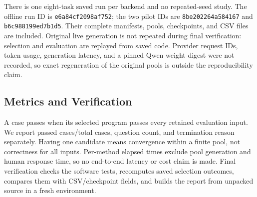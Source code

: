 There is one eight-task saved run per backend and no repeated-seed study. The offline run ID is \texttt{e6a84cf2098af752}; the two pilot IDs are \texttt{8be202264a584167} and \texttt{b6c988199ed7b1d5}. Their complete manifests, pools, checkpoints, and CSV files are included. Original live generation is not repeated during final verification: selection and evaluation are replayed from saved code. Provider request IDs, token usage, generation latency, and a pinned Qwen weight digest were not recorded, so exact regeneration of the original pools is outside the reproducibility claim.

\subsection{Metrics and Verification}
A case passes when its selected program passes every retained evaluation input. We report passed cases/total cases, question count, and termination reason separately. Having one candidate means convergence within a finite pool, not correctness for all inputs. Per-method elapsed times exclude pool generation and human response time, so no end-to-end latency or cost claim is made. Final verification checks the software tests, recomputes saved selection outcomes, compares them with CSV/checkpoint fields, and builds the report from unpacked source in a fresh environment.
